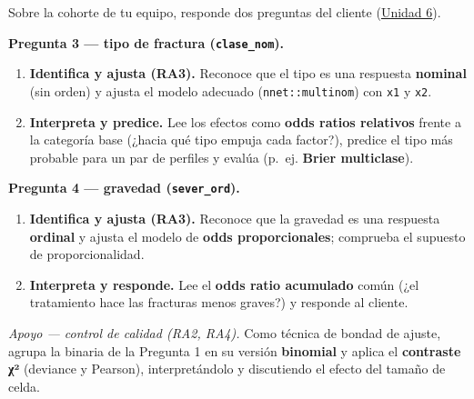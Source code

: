 \documentclass[
  letterpaper,
  DIV=11,
  numbers=noendperiod]{scrartcl}
\providecommand{\tightlist}{%
  \setlength{\itemsep}{0pt}\setlength{\parskip}{0pt}}\usepackage{longtable,booktabs,array}
\begin{document}
\begin{tcolorbox}[enhanced jigsaw, coltitle=black, rightrule=.15mm, arc=.35mm, leftrule=.75mm, colback=white, colbacktitle=quarto-callout-important-color!10!white, left=2mm, breakable, toptitle=1mm, toprule=.15mm, bottomtitle=1mm, titlerule=0mm, title=\textcolor{quarto-callout-important-color}{\faExclamation}\hspace{0.5em}{Tarea del estudiante (1.3) --- resuelve las Preguntas 3 y 4 del caso}, bottomrule=.15mm, opacityback=0, opacitybacktitle=0.6, colframe=quarto-callout-important-color-frame]

Sobre la cohorte de tu equipo, responde dos preguntas del cliente
(\protect\hyperlink{sec-u16}{Unidad 6}).

\textbf{Pregunta 3 --- tipo de fractura (\texttt{clase\_nom}).}

\begin{enumerate}
\def\labelenumi{\arabic{enumi}.}
\tightlist
\item
  \textbf{Identifica y ajusta (RA3).} Reconoce que el tipo es una
  respuesta \textbf{nominal} (sin orden) y ajusta el modelo adecuado
  (\texttt{nnet::multinom}) con \texttt{x1} y \texttt{x2}.
\item
  \textbf{Interpreta y predice.} Lee los efectos como \textbf{odds
  ratios relativos} frente a la categoría base (¿hacia qué tipo empuja
  cada factor?), predice el tipo más probable para un par de perfiles y
  evalúa (p.~ej. \textbf{Brier multiclase}).
\end{enumerate}

\textbf{Pregunta 4 --- gravedad (\texttt{sever\_ord}).}

\begin{enumerate}
\def\labelenumi{\arabic{enumi}.}
\setcounter{enumi}{2}
\tightlist
\item
  \textbf{Identifica y ajusta (RA3).} Reconoce que la gravedad es una
  respuesta \textbf{ordinal} y ajusta el modelo de \textbf{odds
  proporcionales}; comprueba el supuesto de proporcionalidad.
\item
  \textbf{Interpreta y responde.} Lee el \textbf{odds ratio acumulado}
  común (¿el tratamiento hace las fracturas menos graves?) y responde al
  cliente.
\end{enumerate}

\emph{Apoyo --- control de calidad (RA2, RA4).} Como técnica de bondad
de ajuste, agrupa la binaria de la Pregunta 1 en su versión
\textbf{binomial} y aplica el \textbf{contraste χ²} (deviance y
Pearson), interpretándolo y discutiendo el efecto del tamaño de celda.

\end{tcolorbox}
\end{document}
